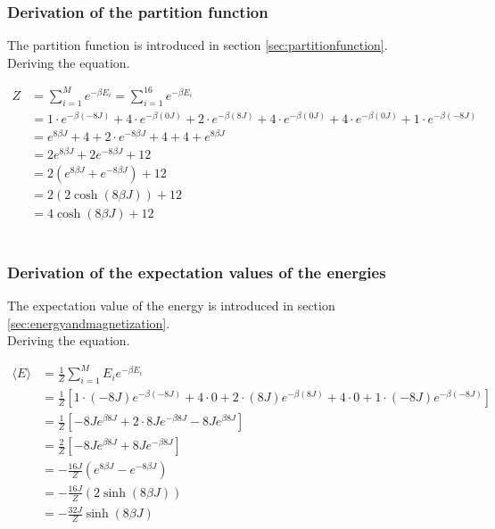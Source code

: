 \documentclass{article}
\begin{document}
\subsubsection{Derivation of the partition function} \label{sec:derivationpartitionfunction}

The partition function is introduced in section \ref{sec:partitionfunction}. \\

Deriving the equation.

\begin{align*}
  Z &= \sum_{i=1} ^{M} e^{- \beta E_i} = \sum_{i=1} ^{16} e^{- \beta E_i} \\
  &= 1 \cdot e^{- \beta (-8J)} + 4 \cdot e^{- \beta (0J)} + 2 \cdot e^{- \beta (8J)} + 4 \cdot e^{- \beta (0J)}
  + 4 \cdot e^{- \beta (0J)} + 1 \cdot e^{- \beta (-8J)} \\
  &= e^{8 \beta J} + 4 + 2 \cdot e^{-8 \beta J} + 4 + 4 + e^{8 \beta J} \\
  &= 2 e^{8 \beta J } + 2 e^{-8 \beta J} + 12 \\
  &= 2 \left( e^{8 \beta J} + e^{- 8 \beta J} \right) + 12 \\
  &= 2 \left( 2 \cosh(8 \beta J) \right) + 12 \\
  &= 4 \cosh(8 \beta J) + 12
\end{align*} \\


\subsubsection{Derivation of the expectation values of the energies} \label{sec:derivationenergies}

The expectation value of the energy is introduced in section \ref{sec:energyandmagnetization}. \\

Deriving the equation.

\begin{align*}
  \langle E \rangle &= \frac{1}{Z} \sum _{i=1} ^M E_i e^{- \beta E_i} \\
  &= \frac{1}{Z} \left[ 1 \cdot (-8J) e^{- \beta (-8J)} + 4 \cdot 0 + 2 \cdot (8J) e^{- \beta (8J)} + 4 \cdot 0 + 1 \cdot (-8J) e^{- \beta (-8J)} \right] \\
  &= \frac{1}{Z} \left[ - 8J e^{\beta 8J} + 2 \cdot 8J e^{- \beta 8J} - 8J e^{ \beta 8J} \right] \\
  &= \frac{2}{Z} \left[ - 8J e^{\beta 8 J} + 8 J e^{- \beta 8 J} \right] \\
  &= - \frac{16 J}{Z} \left( e^{8 \beta J} - e^{- 8 \beta J} \right) \\
  &= - \frac{16 J}{Z} (2 \sinh(8 \beta J) ) \\
  &= - \frac{32 J}{Z} \sinh(8 \beta J)
\end{align*} \\
\end{document}
